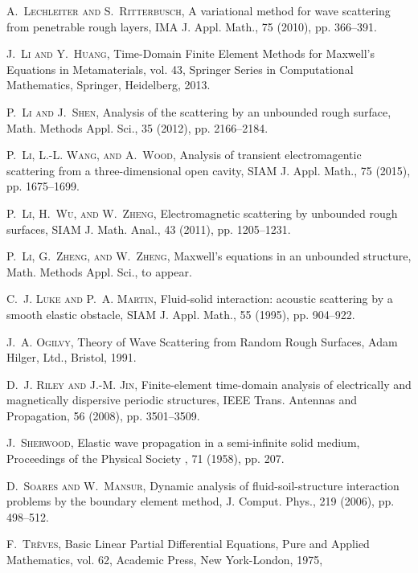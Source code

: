 \documentclass[final,leqno]{siamltex}
\begin{document}
\begin{thebibliography}{10}
\textsc{A.~Lechleiter and S.~Ritterbusch}, A variational method for wave
scattering from penetrable rough layers, IMA J. Appl. Math., 75 (2010),
pp. 366--391.

\textsc{J.~Li and Y.~Huang}, Time-Domain Finite Element Methods for Maxwell's
Equations in Metamaterials, vol. 43, Springer Series in
Computational Mathematics, Springer, Heidelberg, 2013.

\textsc{P.~Li and J.~Shen}, Analysis of the scattering by an unbounded rough
surface, Math. Methods Appl. Sci., 35 (2012), pp. 2166--2184.

\textsc{P.~Li, L.-L. Wang, and A.~Wood}, Analysis of transient electromagentic
scattering from a three-dimensional open cavity, SIAM J. Appl. Math., 75 (2015),
pp. 1675--1699.

\textsc{P.~Li, H.~Wu, and W.~Zheng}, Electromagnetic scattering by unbounded
rough surfaces, SIAM J. Math. Anal., 43 (2011), pp. 1205--1231.

\textsc{P.~Li, G.~Zheng, and W.~Zheng}, Maxwell's equations in an unbounded
structure, Math. Methods Appl. Sci., to appear.

\textsc{C.~J. Luke and P.~A. Martin}, Fluid-solid interaction: acoustic
scattering by a smooth elastic obstacle, SIAM J. Appl. Math., 55 (1995), pp.
904--922.

\textsc{J.~A. Ogilvy}, Theory of Wave Scattering from Random Rough Surfaces,
Adam Hilger, Ltd., Bristol, 1991.

\textsc{D.~J. Riley and J.-M. Jin}, Finite-element time-domain analysis of
electrically and magnetically dispersive periodic structures, IEEE Trans.
Antennas and Propagation, 56 (2008), pp. 3501--3509.

\textsc{J.~Sherwood}, Elastic wave propagation in a semi-infinite solid
medium, Proceedings of the Physical Society , 71 (1958), pp. 207.

\textsc{D.~Soares and W.~Mansur}, Dynamic analysis of fluid-soil-structure
interaction problems by the boundary element method, J. Comput. Phys., 219
(2006), pp. 498--512.

\textsc{F.~Tr{\`e}ves}, Basic Linear Partial Differential Equations, Pure and
Applied Mathematics, vol. 62, Academic Press, New York-London, 1975,


\end{thebibliography}
\end{document}
